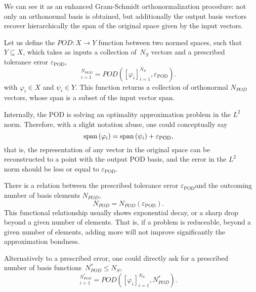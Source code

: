\documentclass[../1_heat_equation.tex]{subfiles}
\newcommand{\epspod}{\ensuremath{\varepsilon_\text{POD}}}
\begin{document}
We can see it as an enhanced Gram-Schmidt orthonormalization procedure: not only an orthonormal basis is obtained, but additionally the output basis vectors recover hierarchically the span of the original space given by the input vectors.

Let us define the $POD: X \rightarrow Y$ function between two normed spaces, 
such that $Y \subseteq  X$, 
which takes as inputs a collection of~$N_S$ vectors and a prescribed tolerance error $\epspod$,
\begin{equation}
    [\psi_i]_{i=1}^{N_{POD}} = POD\left([\varphi_i]_{i=1}^{N_S}, \epspod\right).
\end{equation}
with $\varphi_i \in X$ and $\psi_i \in Y$.
This function returns a collection of orthonormal $N_{POD}$ vectors, whose span is a subset of the input vector span.

Internally, the POD is solving an optimality approximation problem in the $L^2$ norm. 
Therefore, with a slight notation abuse, one could conceptually say
\begin{equation}
    \spn{\varphi_i} = \spn{\psi_i} + \epspod,
\end{equation}
that is, the representation of any vector in the original space can be reconstructed to a point with the output POD basis, 
and the error in the $L^2$ norm should be less or equal to \epspod.

There is a relation between the prescribed tolerance error \epspod and the outcoming number of basis elements $N_{POD}$, 
\begin{equation}
    N_{POD} = N_{POD}(\epspod).
\end{equation}
This functional relationship usually shows exponential decay, or a sharp drop beyond a given number of elements.
That is, if a problem is reduceable, beyond a given number of elements, adding more will not improve significantly the approximation bondness. 

Alternatively to a prescribed error, one could directly ask for a prescribed number of basis functions~$N^{*}_{POD} \leq N_S$,
\begin{equation}
    [\psi_i]_{i=1}^{N^{*}_{POD}} = POD\left([\varphi_i]_{i=1}^{N_S}, N^{*}_{POD}\right).
\end{equation}
\end{document}
